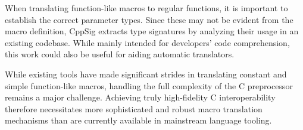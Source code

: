 When translating function-like macros to regular functions, it is important to establish the correct parameter types. Since these may not be evident from the macro definition, CppSig \cite{cppsig} extracts type signatures by analyzing their usage in an existing codebase. While mainly intended for developers' code comprehension, this work could also be useful for aiding automatic translators.

While existing tools have made significant strides in translating constant and simple function-like macros, handling the full complexity of the C preprocessor remains a major challenge. Achieving truly high-fidelity C interoperability therefore necessitates more sophisticated and robust macro translation mechanisms than are currently available in mainstream language tooling.